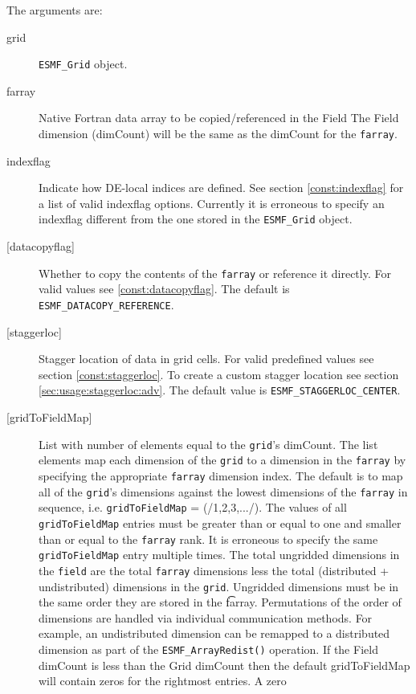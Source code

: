   The arguments are: 
   \begin{description} 
   \item [grid] 
   {\tt ESMF\_Grid} object. 
   \item [farray] 
   Native Fortran data array to be copied/referenced in the Field 
   The Field dimension (dimCount) will be the same as the dimCount 
   for the {\tt farray}. 
   \item[indexflag] 
   Indicate how DE-local indices are defined. See section 
   \ref{const:indexflag} for a list of valid indexflag options. 
   Currently it is erroneous to specify an indexflag 
   different from the one stored in the {\tt ESMF\_Grid} object. 
   \item [{[datacopyflag]}] 
   Whether to copy the contents of the {\tt farray} or reference it directly. 
   For valid values see \ref{const:datacopyflag}. The default is 
   {\tt ESMF\_DATACOPY\_REFERENCE}. 
   \item [{[staggerloc]}] 
   Stagger location of data in grid cells. For valid 
   predefined values see section \ref{const:staggerloc}. 
   To create a custom stagger location see section 
   \ref{sec:usage:staggerloc:adv}. The default 
   value is {\tt ESMF\_STAGGERLOC\_CENTER}. 
   \item [{[gridToFieldMap]}] 
   List with number of elements equal to the 
   {\tt grid}'s dimCount. The list elements map each dimension 
   of the {\tt grid} to a dimension in the {\tt farray} by 
   specifying the appropriate {\tt farray} dimension index. The default is to 
   map all of the {\tt grid}'s dimensions against the lowest dimensions of 
   the {\tt farray} in sequence, i.e. {\tt gridToFieldMap} = (/1,2,3,.../). 
   The values of all {\tt gridToFieldMap} entries must be greater than or equal 
   to one and smaller than or equal to the {\tt farray} rank. 
   It is erroneous to specify the same {\tt gridToFieldMap} entry 
   multiple times. The total ungridded dimensions in the {\tt field} 
   are the total {\tt farray} dimensions less 
   the total (distributed + undistributed) dimensions in 
   the {\tt grid}. Ungridded dimensions must be in the same order they are 
   stored in the {\t farray}. Permutations of the order of 
   dimensions are handled via individual communication methods. For example, 
   an undistributed dimension can be remapped to a distributed dimension 
   as part of the {\tt ESMF\_ArrayRedist()} operation. 
   If the Field dimCount is less than the Grid dimCount then the default 
   gridToFieldMap will contain zeros for the rightmost entries. A zero 

\end{description}
